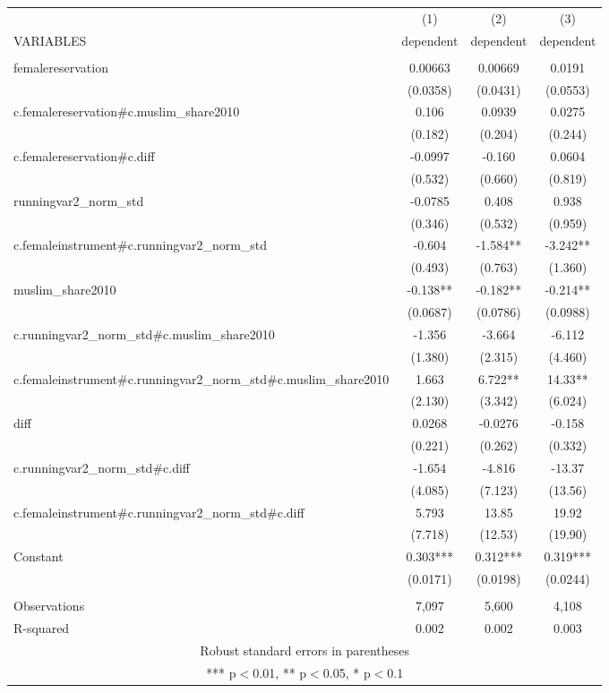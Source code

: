 \documentclass[]{article}
\begin{document}
\begin{tabular}{lccc} \hline
 & (1) & (2) & (3) \\
VARIABLES & dependent & dependent & dependent \\ \hline
 &  &  &  \\
femalereservation & 0.00663 & 0.00669 & 0.0191 \\
 & (0.0358) & (0.0431) & (0.0553) \\
c.femalereservation\#c.muslim\_share2010 & 0.106 & 0.0939 & 0.0275 \\
 & (0.182) & (0.204) & (0.244) \\
c.femalereservation\#c.diff & -0.0997 & -0.160 & 0.0604 \\
 & (0.532) & (0.660) & (0.819) \\
runningvar2\_norm\_std & -0.0785 & 0.408 & 0.938 \\
 & (0.346) & (0.532) & (0.959) \\
c.femaleinstrument\#c.runningvar2\_norm\_std & -0.604 & -1.584** & -3.242** \\
 & (0.493) & (0.763) & (1.360) \\
muslim\_share2010 & -0.138** & -0.182** & -0.214** \\
 & (0.0687) & (0.0786) & (0.0988) \\
c.runningvar2\_norm\_std\#c.muslim\_share2010 & -1.356 & -3.664 & -6.112 \\
 & (1.380) & (2.315) & (4.460) \\
c.femaleinstrument\#c.runningvar2\_norm\_std\#c.muslim\_share2010 & 1.663 & 6.722** & 14.33** \\
 & (2.130) & (3.342) & (6.024) \\
diff & 0.0268 & -0.0276 & -0.158 \\
 & (0.221) & (0.262) & (0.332) \\
c.runningvar2\_norm\_std\#c.diff & -1.654 & -4.816 & -13.37 \\
 & (4.085) & (7.123) & (13.56) \\
c.femaleinstrument\#c.runningvar2\_norm\_std\#c.diff & 5.793 & 13.85 & 19.92 \\
 & (7.718) & (12.53) & (19.90) \\
Constant & 0.303*** & 0.312*** & 0.319*** \\
 & (0.0171) & (0.0198) & (0.0244) \\
 &  &  &  \\
Observations & 7,097 & 5,600 & 4,108 \\
 R-squared & 0.002 & 0.002 & 0.003 \\ \hline
\multicolumn{4}{c}{ Robust standard errors in parentheses} \\
\multicolumn{4}{c}{ *** p$<$0.01, ** p$<$0.05, * p$<$0.1} \\
\end{tabular}
\end{document}
